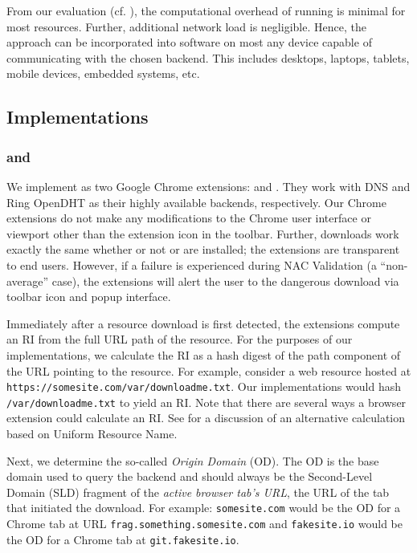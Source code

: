 From our evaluation (cf. ), the computational overhead of
running \SYSTEM{} is minimal for most resources. Further, additional network
load is negligible. Hence, the \SYSTEM{} approach can be incorporated into
software on most any device capable of communicating with the chosen backend.
This includes desktops, laptops, tablets, mobile devices, embedded systems, etc.

\subsection{Implementations}

\subsubsection{\DNSSYS{} and \DHTSYS{}}

We implement \SYSTEM{} as two Google Chrome extensions:
\DNSSYS{} and \DHTSYS{}. They work with DNS and Ring OpenDHT as their highly
available backends, respectively. Our Chrome extensions do not make any
modifications to the Chrome user interface or viewport other than the extension
icon in the toolbar. Further, downloads work exactly the same whether or not
\DNSSYS{} or \DHTSYS{} are installed; the extensions are transparent to end
users. However, if a failure is experienced during NAC Validation (\ie a
``non-average'' case), the extensions will alert the user to the dangerous
download via toolbar icon and popup interface.

Immediately after a resource download is first detected, the extensions compute
an RI from the full URL path of the resource. For the purposes of our
implementations, we calculate the RI as a hash digest of the
path component of the URL pointing to the resource. For example, consider a web
resource hosted at \texttt{https://somesite.com/var/downloadme.txt}. Our
implementations would hash \texttt{/var/downloadme.txt} to yield an RI. Note
that there are several ways a browser extension could calculate an RI. See
 for a discussion of an alternative calculation based on
Uniform Resource Name.

Next, we determine the so-called \emph{Origin Domain} (OD). The OD is the base
domain used to query the backend and should always be the Second-Level Domain
(SLD) fragment of the \emph{active browser tab's URL}, \ie the URL of the tab
that initiated the download. For example: \texttt{somesite.com} would be the OD
for a Chrome tab at URL \texttt{frag.something.somesite.com} and
\texttt{fakesite.io} would be the OD for a Chrome tab at
\texttt{git.fakesite.io}.

